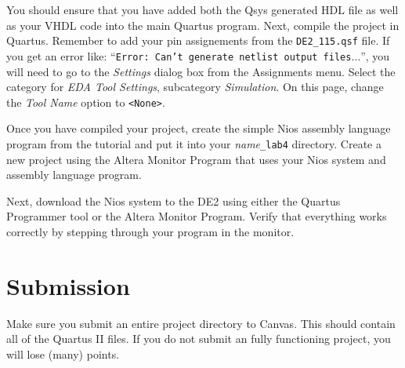\documentclass[10pt]{article}
\begin{document}
You should ensure that you have added both the Qsys generated HDL file as well
as your VHDL code into the main Quartus program. Next, compile the project in
Quartus. Remember to add your pin assignements from the {\tt DE2\_115.qsf}
file. If you get an error like: ``{\tt Error: Can't generate netlist output
  files$\ldots$}'', you will need to go to the {\em Settings} dialog box from
the Assignments menu. Select the category for {\em EDA Tool Settings},
subcategory {\em Simulation}. On this page, change the {\em Tool Name} option
to {\tt <None>}.

Once you have compiled your project, create the simple Nios assembly language
program from the tutorial and put it into your {\em name}{\tt \_lab4}
directory. Create a new project using the Altera Monitor Program that uses your
Nios system and assembly language program.

Next, download the Nios system to the DE2 using either the Quartus Programmer
tool or the Altera Monitor Program. Verify that everything works correctly by
stepping through your program in the monitor.

\section*{Submission}

Make sure you submit an entire project directory to Canvas. This should contain
all of the Quartus II files. If you do not submit an fully functioning project,
you will lose (many) points.
\end{document}
